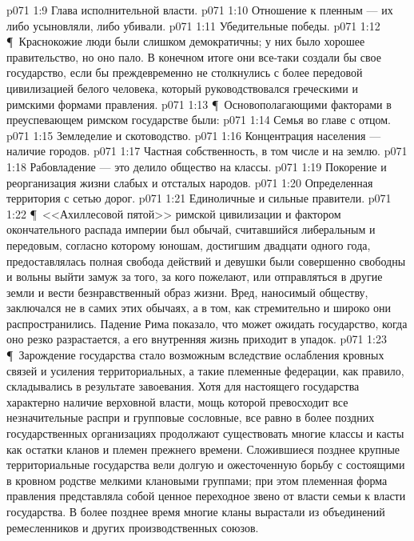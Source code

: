 \vs p071 1:9 \bibnobreakspace Глава исполнительной власти.
\vs p071 1:10 \bibnobreakspace Отношение к пленным --- их либо усыновляли, либо убивали.
\vs p071 1:11 \bibnobreakspace Убедительные победы.
\vs p071 1:12 \P\ Краснокожие люди были слишком демократичны; у них было хорошее правительство, но оно пало. В конечном итоге они все\hyp{}таки создали бы свое государство, если бы преждевременно не столкнулись с более передовой цивилизацией белого человека, который руководствовался греческими и римскими формами правления.
\vs p071 1:13 \P\ Основополагающими факторами в преуспевающем римском государстве были:
\vs p071 1:14 \bibnobreakspace Семья во главе с отцом.
\vs p071 1:15 \bibnobreakspace Земледелие и скотоводство.
\vs p071 1:16 \bibnobreakspace Концентрация населения --- наличие городов.
\vs p071 1:17 \bibnobreakspace Частная собственность, в том числе и на землю.
\vs p071 1:18 \bibnobreakspace Рабовладение --- это делило общество на классы.
\vs p071 1:19 \bibnobreakspace Покорение и реорганизация жизни слабых и отсталых народов.
\vs p071 1:20 \bibnobreakspace Определенная территория с сетью дорог.
\vs p071 1:21 \bibnobreakspace Единоличные и сильные правители.
\vs p071 1:22 \P\ <<Ахиллесовой пятой>> римской цивилизации и фактором окончательного распада империи был обычай, считавшийся либеральным и передовым, согласно которому юношам, достигшим двадцати одного года, предоставлялась полная свобода действий и девушки были совершенно свободны и вольны выйти замуж за того, за кого пожелают, или отправляться в другие земли и вести безнравственный образ жизни. Вред, наносимый обществу, заключался не в самих этих обычаях, а в том, как стремительно и широко они распространились. Падение Рима показало, что может ожидать государство, когда оно резко разрастается, а его внутренняя жизнь приходит в упадок.
\vs p071 1:23 \P\ Зарождение государства стало возможным вследствие ослабления кровных связей и усиления территориальных, а такие племенные федерации, как правило, складывались в результате завоевания. Хотя для настоящего государства характерно наличие верховной власти, мощь которой превосходит все незначительные распри и групповые сословные, все равно в более поздних государственных организациях продолжают существовать многие классы и касты как остатки кланов и племен прежнего времени. Сложившиеся позднее крупные территориальные государства вели долгую и ожесточенную борьбу с состоящими в кровном родстве мелкими клановыми группами; при этом племенная форма правления представляла собой ценное переходное звено от власти семьи к власти государства. В более позднее время многие кланы вырастали из объединений ремесленников и других производственных союзов.
